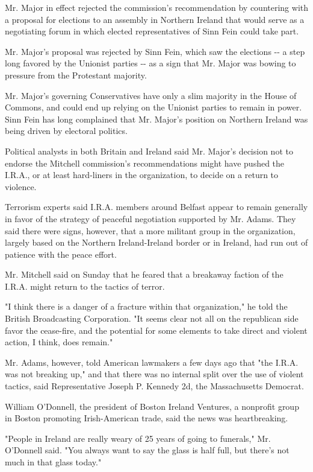 Mr. Major in effect rejected the commission's recommendation by
countering with a proposal for elections to an assembly in Northern
Ireland that would serve as a negotiating forum in which elected
representatives of Sinn Fein could take part.

Mr. Major's proposal was rejected by Sinn Fein, which saw the elections
-\/- a step long favored by the Unionist parties -\/- as a sign that Mr.
Major was bowing to pressure from the Protestant majority.

Mr. Major's governing Conservatives have only a slim majority in the
House of Commons, and could end up relying on the Unionist parties to
remain in power. Sinn Fein has long complained that Mr. Major's position
on Northern Ireland was being driven by electoral politics.

Political analysts in both Britain and Ireland said Mr. Major's decision
not to endorse the Mitchell commission's recommendations might have
pushed the I.R.A., or at least hard-liners in the organization, to
decide on a return to violence.

Terrorism experts said I.R.A. members around Belfast appear to remain
generally in favor of the strategy of peaceful negotiation supported by
Mr. Adams. They said there were signs, however, that a more militant
group in the organization, largely based on the Northern Ireland-Ireland
border or in Ireland, had run out of patience with the peace effort.

Mr. Mitchell said on Sunday that he feared that a breakaway faction of
the I.R.A. might return to the tactics of terror.

"I think there is a danger of a fracture within that organization," he
told the British Broadcasting Corporation. "It seems clear not all on
the republican side favor the cease-fire, and the potential for some
elements to take direct and violent action, I think, does remain."

Mr. Adams, however, told American lawmakers a few days ago that "the
I.R.A. was not breaking up," and that there was no internal split over
the use of violent tactics, said Representative Joseph P. Kennedy 2d,
the Massachusetts Democrat.

William O'Donnell, the president of Boston Ireland Ventures, a nonprofit
group in Boston promoting Irish-American trade, said the news was
heartbreaking.

"People in Ireland are really weary of 25 years of going to funerals,"
Mr. O'Donnell said. "You always want to say the glass is half full, but
there's not much in that glass today."

